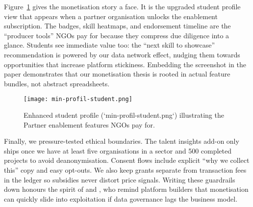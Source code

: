 Figure~\ref{fig:student-profile} gives the monetisation story a face. It is the upgraded student profile view that appears when a partner organisation unlocks the enablement subscription. The badges, skill heatmaps, and endorsement timeline are the ``producer tools'' NGOs pay for because they compress due diligence into a glance. Students see immediate value too: the ``next skill to showcase'' recommendation is powered by our data network effect, nudging them towards opportunities that increase platform stickiness. Embedding the screenshot in the paper demonstrates that our monetisation thesis is rooted in actual feature bundles, not abstract spreadsheets.

\begin{figure}[h]
  \centering
  \texttt{[image: min-profil-student.png]}
  \caption{Enhanced student profile (`min-profil-student.png`) illustrating the Partner enablement features NGOs pay for.}
  \label{fig:student-profile}
\end{figure}

Finally, we pressure-tested ethical boundaries. The talent insights add-on only ships once we have at least five organisations in a sector and 500 completed projects to avoid deanonymisation. Consent flows include explicit ``why we collect this'' copy and easy opt-outs. We also keep grants separate from transaction fees in the ledger so subsidies never distort price signals. Writing these guardrails down honours the spirit of \citet{Zuboff2019} and \citet{Srnicek2017}, who remind platform builders that monetisation can quickly slide into exploitation if data governance lags the business model.
